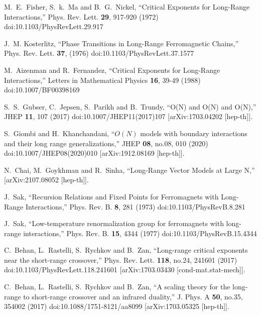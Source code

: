\documentclass[aps,amsmath,amssymb,prd,showpacs,floatfix,preprint,superscriptaddress,nofootinbib,12pt]{article}
\begin{document}
\begin{thebibliography}{99}
M.~E.~Fisher, S.~k.~Ma and B.~G.~Nickel,
``Critical Exponents for Long-Range Interactions,''
Phys. Rev. Lett. \textbf{29}, 917-920 (1972)
doi:10.1103/PhysRevLett.29.917

J.~M. Kosterlitz,
``Phase Transitions in Long-Range Ferromagnetic Chains,''
Phys. Rev. Lett. \textbf{37}, (1976)
doi:10.1103/PhysRevLett.37.1577

M.~Aizenman and R.~Fernandez,
``Critical Exponents for Long-Range Interactions,''
Letters in Mathematical Physics \textbf{16}, 39-49 (1988)
doi:10.1007/BF00398169

S.~S.~Gubser, C.~Jepsen, S.~Parikh and B.~Trundy,
``O(N) and O(N) and O(N),''
JHEP \textbf{11}, 107 (2017)
doi:10.1007/JHEP11(2017)107
[arXiv:1703.04202 [hep-th]].

S.~Giombi and H.~Khanchandani,
``$O(N)$ models with boundary interactions and their long range generalizations,''
JHEP \textbf{08}, no.08, 010 (2020)
doi:10.1007/JHEP08(2020)010
[arXiv:1912.08169 [hep-th]].

N.~Chai, M.~Goykhman and R.~Sinha,
``Long-Range Vector Models at Large N,''
[arXiv:2107.08052 [hep-th]].

J.~Sak,
``Recursion Relations and Fixed Points for Ferromagnets with Long-Range Interactions,''
Phys. Rev. B. \textbf{8}, 281 (1973)
doi:10.1103/PhysRevB.8.281

J.~Sak,
``Low-temperature renormalization group for ferromagnets with long-range interactions,''
Phys. Rev. B. \textbf{15}, 4344 (1977)
doi:10.1103/PhysRevB.15.4344

C.~Behan, L.~Rastelli, S.~Rychkov and B.~Zan,
``Long-range critical exponents near the short-range crossover,''
Phys. Rev. Lett. \textbf{118}, no.24, 241601 (2017)
doi:10.1103/PhysRevLett.118.241601
[arXiv:1703.03430 [cond-mat.stat-mech]].

C.~Behan, L.~Rastelli, S.~Rychkov and B.~Zan,
``A scaling theory for the long-range to short-range crossover and an infrared duality,''
J. Phys. A \textbf{50}, no.35, 354002 (2017)
doi:10.1088/1751-8121/aa8099
[arXiv:1703.05325 [hep-th]].


\end{thebibliography}
\end{document}
